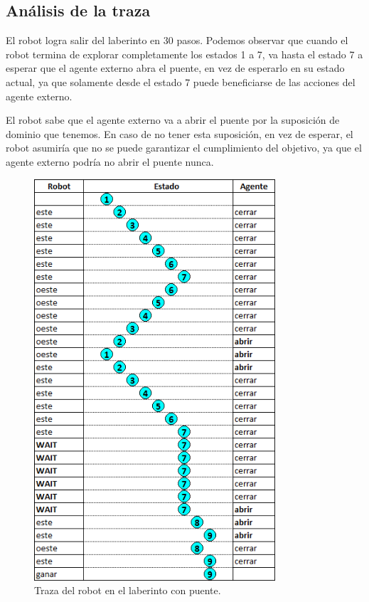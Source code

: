 \subsection{Análisis de la traza}

El robot logra salir del laberinto en 30 pasos. Podemos observar que cuando el robot termina de explorar completamente los estados 1 a 7, 
va hasta el estado 7 a esperar que el agente externo abra el puente, en vez de esperarlo en su estado actual, ya que solamente desde el estado 7 
puede beneficiarse de las acciones del agente externo.

\vspace{\baselineskip}

El robot sabe que el agente externo va a abrir el puente por la suposición de dominio que tenemos. En caso de no tener esta suposición, 
en vez de esperar, el robot asumiría que no se puede garantizar el cumplimiento del objetivo, ya que el agente externo podría no abrir el puente nunca.

\begin{figure}[H]
	\centering
		\includegraphics[width=0.8\textwidth]{Imagenes/Laberintos/puente_traza.png}
	\caption{Traza del robot en el laberinto con puente.}
	\label{fig:puente_traza}
\end{figure}
